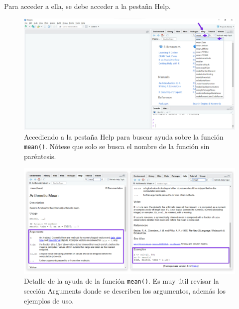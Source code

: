 \documentclass[
]{article}
\theoremstyle{definition}
\theoremstyle{definition}
\theoremstyle{definition}
\theoremstyle{definition}
\theoremstyle{remark}
\begin{document}
Para acceder a ella, se debe acceder a la pestaña Help.



\begin{figure}

{\centering \includegraphics[width=1\linewidth]{figs/screenshots/help1} 

}

\caption{Accediendo a la pestaña Help para buscar ayuda sobre la función \texttt{mean()}. Nótese que solo se busca el nombre de la función sin paréntesis.}\label{fig:figura37}
\end{figure}



\begin{figure}

{\centering \includegraphics[width=1\linewidth]{figs/screenshots/help2} 

}

\caption{Detalle de la ayuda de la función \texttt{mean()}. Es muy útil revisar la sección Arguments donde se describen los argumentos, además los ejemplos de uso.}\label{fig:figura38}
\end{figure}
\end{document}

